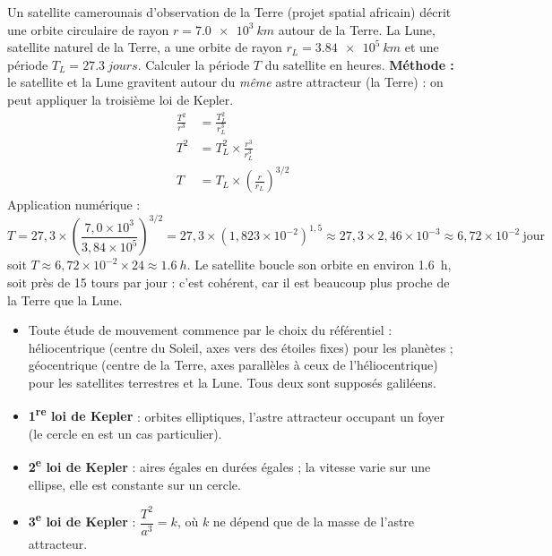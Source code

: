 \documentclass[11pt]{article}
\newcommand{\cle}[1]{{\popxbold\color{popdark}#1}}
\begin{document}
\begin{exoresolu}
Un satellite camerounais d'observation de la Terre (projet spatial africain) décrit une orbite circulaire de rayon $r = \SI{7,0e3}{km}$ autour de la Terre. La Lune, satellite naturel de la Terre, a une orbite de rayon $r_L = \SI{3,84e5}{km}$ et une période $T_L = \SI{27,3}{jours}$. Calculer la période $T$ du satellite en heures.
\tcblower
\textbf{Méthode :} le satellite et la Lune gravitent autour du \emph{même} astre attracteur (la Terre) : on peut appliquer la troisième loi de Kepler.
\begin{align*}
\frac{T^2}{r^3} &= \frac{T_L^2}{r_L^3} \\
T^2 &= T_L^2 \times \frac{r^3}{r_L^3} \\
T &= T_L \times \left(\frac{r}{r_L}\right)^{3/2}
\end{align*}
Application numérique :
\[ T = 27{,}3 \times \left(\frac{7{,}0\times 10^{3}}{3{,}84\times 10^{5}}\right)^{3/2} = 27{,}3 \times (1{,}823\times 10^{-2})^{1{,}5} \approx 27{,}3 \times 2{,}46\times 10^{-3} \approx 6{,}72\times 10^{-2}\ \text{jour} \]
soit $T \approx 6{,}72\times 10^{-2} \times 24 \approx \SI{1,6}{h}$. Le satellite boucle son orbite en environ \SI{1,6}{h}, soit près de 15 tours par jour : c'est cohérent, car il est beaucoup plus proche de la Terre que la Lune.
\end{exoresolu}

\begin{aretenir}
\begin{itemize}
\item Toute étude de mouvement commence par le choix du référentiel : \cle{héliocentrique} (centre du Soleil, axes vers des étoiles fixes) pour les planètes ; \cle{géocentrique} (centre de la Terre, axes parallèles à ceux de l'héliocentrique) pour les satellites terrestres et la Lune. Tous deux sont supposés galiléens.
\item \textbf{1\textsuperscript{re} loi de Kepler} : orbites elliptiques, l'astre attracteur occupant un foyer (le cercle en est un cas particulier).
\item \textbf{2\textsuperscript{e} loi de Kepler} : aires égales en durées égales ; la vitesse varie sur une ellipse, elle est constante sur un cercle.
\item \textbf{3\textsuperscript{e} loi de Kepler} : $\dfrac{T^2}{a^3} = k$, où $k$ ne dépend que de la masse de l'\cle{astre attracteur}.
\end{itemize}
\end{aretenir}
\end{document}
